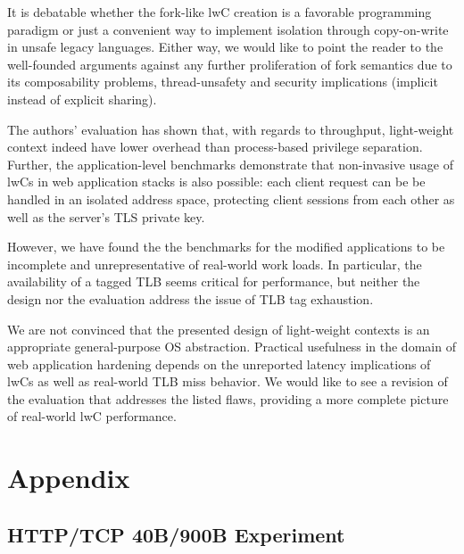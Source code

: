 \documentclass[10pt,twocolumn,a4paper]{article}
\begin{document}
It is debatable whether the fork-like lwC creation is a favorable programming paradigm or just a convenient way to implement isolation through copy-on-write in unsafe legacy languages.
Either way, we would like to point the reader to the well-founded arguments against any further proliferation of fork semantics due to its composability problems, thread-unsafety and security implications (implicit instead of explicit sharing).\cite{baumann2019a}

The authors' evaluation has shown that, with regards to throughput, light-weight context indeed have lower overhead than process-based privilege separation.
Further, the application-level benchmarks demonstrate that non-invasive usage of lwCs in web application stacks is also possible:
each client request can be be handled in an isolated address space, protecting client sessions from each other as well as the server's TLS private key.

However, we have found the the benchmarks for the modified applications to be incomplete and unrepresentative of real-world work loads.
In particular, the availability of a tagged TLB seems critical for performance, but neither the design nor the evaluation address the issue of TLB tag exhaustion.

We are not convinced that the presented design of light-weight contexts is an appropriate general-purpose OS abstraction.
Practical usefulness in the domain of web application hardening depends on the unreported latency implications of lwCs as well as real-world TLB miss behavior.
We would like to see a revision of the evaluation that addresses the listed flaws, providing a more complete picture of real-world lwC performance.

\onecolumn
\section{Appendix}

\subsection{HTTP/TCP 40B/900B Experiment}\label{appendix:httppayloads}



\twocolumn
\nocite{*}
\clearpage
\printbibliography
\end{document}
